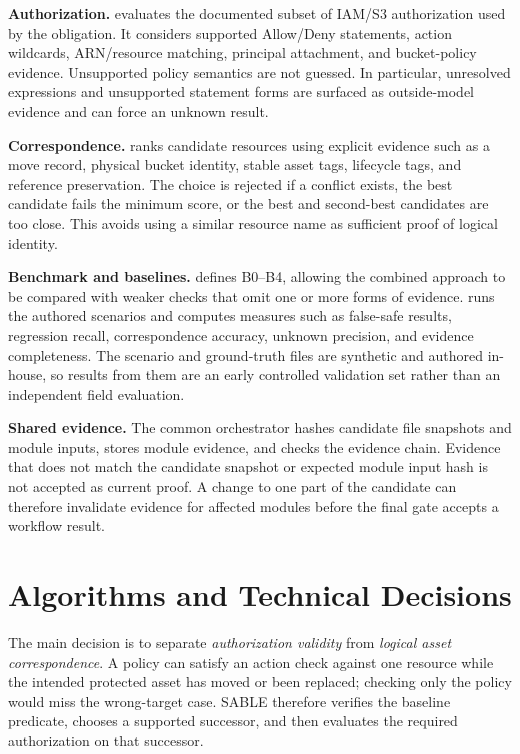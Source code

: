 \textbf{Authorization.}  evaluates the documented subset of IAM/S3 authorization used by the obligation. It considers supported Allow/Deny statements, action wildcards, ARN/resource matching, principal attachment, and bucket-policy evidence. Unsupported policy semantics are not guessed. In particular, unresolved expressions and unsupported statement forms are surfaced as outside-model evidence and can force an unknown result.

\textbf{Correspondence.}  ranks candidate resources using explicit evidence such as a move record, physical bucket identity, stable asset tags, lifecycle tags, and reference preservation. The choice is rejected if a conflict exists, the best candidate fails the minimum score, or the best and second-best candidates are too close. This avoids using a similar resource name as sufficient proof of logical identity.

\textbf{Benchmark and baselines.}  defines B0--B4, allowing the combined approach to be compared with weaker checks that omit one or more forms of evidence.  runs the authored scenarios and computes measures such as false-safe results, regression recall, correspondence accuracy, unknown precision, and evidence completeness. The scenario and ground-truth files are synthetic and authored in-house, so results from them are an early controlled validation set rather than an independent field evaluation.

\textbf{Shared evidence.} The common orchestrator hashes candidate file snapshots and module inputs, stores module evidence, and checks the evidence chain. Evidence that does not match the candidate snapshot or expected module input hash is not accepted as current proof. A change to one part of the candidate can therefore invalidate evidence for affected modules before the final gate accepts a workflow result.

\section{Algorithms and Technical Decisions}

The main decision is to separate \emph{authorization validity} from \emph{logical asset correspondence}. A policy can satisfy an action check against one resource while the intended protected asset has moved or been replaced; checking only the policy would miss the wrong-target case. SABLE therefore verifies the baseline predicate, chooses a supported successor, and then evaluates the required authorization on that successor.

